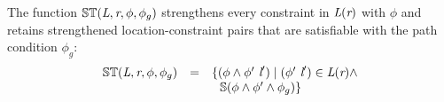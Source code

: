 \begin{definition}
\label{def:ST}
The function $\mathbb{ST}(\emph{L},\emph{r},\phi,\phi_g)$
strengthens every constraint in $\emph{L}(\emph{r})$ with
$\phi$ and retains strengthened location-constraint pairs that are satisfiable
with the path condition $\phi_g$:
\[
\begin{array}{rcl} 
\mathbb{ST}(\cfgnt{L},\cfgnt{r},\phi,\phi_g) & = & \{ (\phi\wedge\phi^\prime\ \cfgnt{l}^\prime) \mid (\phi^\prime\ \cfgnt{l}^\prime)\in \cfgnt{L}(\cfgnt{r})\wedge \\ & & 
\ \ \mathbb{S}(\phi\wedge\phi^\prime\wedge\phi_g) \}
\end{array}
\]
\end{definition}
